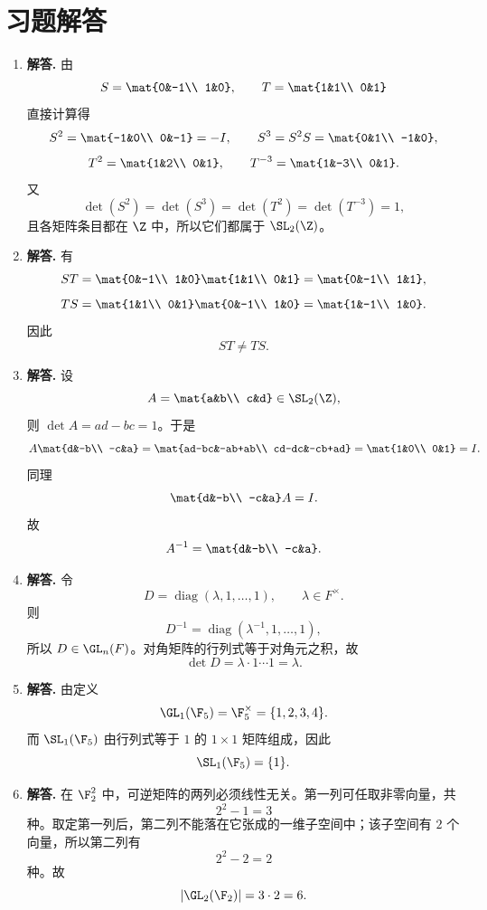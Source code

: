 \section*{习题解答}
\begin{enumerate}[label=\textbf{\arabic*.}, leftmargin=*, itemsep=1em]
\item \textbf{解答.} 由
\[
S=\mat{0&-1\\ 1&0},\qquad T=\mat{1&1\\ 0&1}
\]
直接计算得
\[
S^2=\mat{-1&0\\ 0&-1}=-I,\qquad
S^3=S^2S=\mat{0&1\\ -1&0},
\]
\[
T^2=\mat{1&2\\ 0&1},\qquad
T^{-3}=\mat{1&-3\\ 0&1}.
\]
又
\[
\det(S^2)=\det(S^3)=\det(T^2)=\det(T^{-3})=1,
\]
且各矩阵条目都在 $\Z$ 中，所以它们都属于 $\SL_2(\Z)$。

\item \textbf{解答.} 有
\[
ST=\mat{0&-1\\ 1&0}\mat{1&1\\ 0&1}
=\mat{0&-1\\ 1&1},
\]
\[
TS=\mat{1&1\\ 0&1}\mat{0&-1\\ 1&0}
=\mat{1&-1\\ 1&0}.
\]
因此
\[
ST\neq TS.
\]

\item \textbf{解答.} 设
\[
A=\mat{a&b\\ c&d}\in \SL_2(\Z),
\]
则 $\det A=ad-bc=1$。于是
\[
A\mat{d&-b\\ -c&a}
=\mat{ad-bc&-ab+ab\\ cd-dc&-cb+ad}
=\mat{1&0\\ 0&1}=I.
\]
同理
\[
\mat{d&-b\\ -c&a}A=I.
\]
故
\[
A^{-1}=\mat{d&-b\\ -c&a}.
\]

\item \textbf{解答.} 令
\[
D=\operatorname{diag}(\lambda,1,\dots,1),\qquad \lambda\in F^\times.
\]
则
\[
D^{-1}=\operatorname{diag}(\lambda^{-1},1,\dots,1),
\]
所以 $D\in \GL_n(F)$。对角矩阵的行列式等于对角元之积，故
\[
\det D=\lambda\cdot 1\cdots 1=\lambda.
\]

\item \textbf{解答.} 由定义
\[
\GL_1(\F_5)=\F_5^\times=\{1,2,3,4\}.
\]
而 $\SL_1(\F_5)$ 由行列式等于 $1$ 的 $1\times1$ 矩阵组成，因此
\[
\SL_1(\F_5)=\{1\}.
\]

\item \textbf{解答.} 在 $\F_2^2$ 中，可逆矩阵的两列必须线性无关。第一列可任取非零向量，共
\[
2^2-1=3
\]
种。取定第一列后，第二列不能落在它张成的一维子空间中；该子空间有 $2$ 个向量，所以第二列有
\[
2^2-2=2
\]
种。故
\[
|\GL_2(\F_2)|=3\cdot 2=6.
\]


\end{enumerate}
